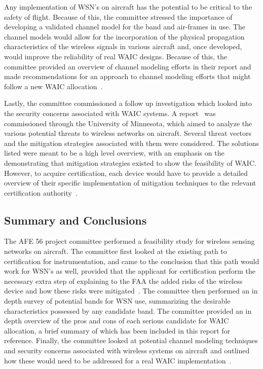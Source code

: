 Any implementation of WSN's on aircraft has the potential to be critical to the safety of flight. Because of this, the committee stressed the importance of  developing a validated channel model for the band and air-frames in use. The channel models would allow for the incorporation of the physical propagation characteristics of the wireless signals in various aircraft and, once developed, would improve the reliability of real WAIC designs. Because of this, the committee provided an overview of channel modeling efforts in their report and made recommendations for an approach to channel modeling efforts that might follow a new WAIC allocation~\cite{ferrell_feasibility_2007}. 

Lastly, the committee commissioned a follow up investigation which looked into the security concerns associated with WAIC systems. A report~\cite{tewfik_university_2009} was commissioned through the University of Minnesota, which aimed to analyze the various potential threats to wireless networks on aircraft. Several threat vectors and the mitigation strategies associated with them were considered. The solutions listed were meant to be a high level overview, with an emphasis on the demonstrating that mitigation strategies existed to show  the feasibility of WAIC. However, to acquire certification, each device would have to provide a detailed overview of their specific implementation of mitigation techniques to the relevant certification authority~\cite{tewfik_university_2009}. 

\subsection{Summary and Conclusions}
The AFE 56 project committee performed a feasibility study for wireless sensing networks on aircraft. The committee first looked at the existing path to certification for instrumentation, and came to the conclusion that this path would work for WSN's as well, provided that the applicant for certification perform the necessary extra step of explaining to the FAA the added risks of the wireless device and how these risks were mitigated~\cite{ferrell_feasibility_2007}. The committee then performed an in depth survey of potential bands for WSN use, summarizing the desirable characteristics possessed by any candidate band. The committee provided an in depth overview of the pros and cons of each serious candidate for WAIC allocation, a brief summary of which has been included in this report for reference. Finally, the  committee looked at potential channel modeling techniques and security concerns associated with wireless systems on aircraft and outlined how these would need to be addressed for a real WAIC implementation~\cite{tewfik_university_2009}. 

